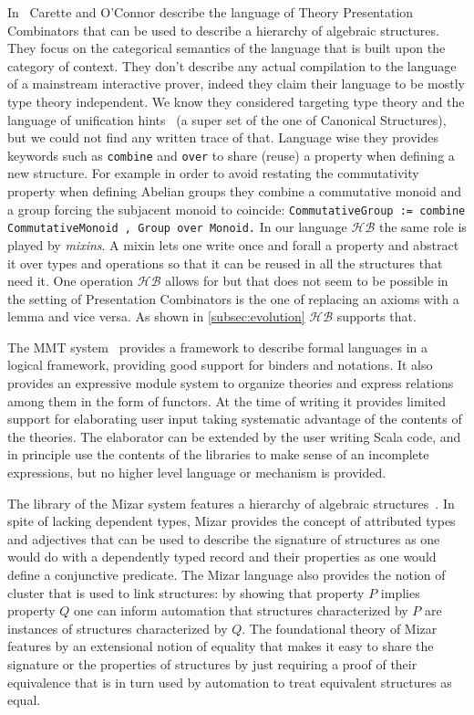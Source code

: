 \documentclass[a4paper,UKenglish,cleveref, autoref]{lipics-v2019}
\newcommand{\HB}{\ensuremath{\mathcal{HB}}}
\newcommand{\mixin}{mixin}
\newcommand{\mixins}{mixins}
\theoremstyle{implem}
\theoremstyle{implem}
\theoremstyle{command}
\begin{document}
{{In~\cite{CaretteCombinators} Carette and O'Connor describe the language of
Theory Presentation Combinators that can be used to describe a hierarchy of
algebraic structures.
They focus on the categorical semantics of the language that is built upon
the category of context.
They don't describe any actual compilation to the language of a mainstream
interactive prover, indeed they claim their language to be mostly type theory
independent. We know they considered targeting type theory and the language
of unification hints~\cite{10.1007/978-3-642-03359-9_8}
(a super set of the one of Canonical Structures),
but we could not find any written trace of that. Language wise they provides
keywords such as \verb+combine+ and \verb+over+ to share (reuse) a property
when defining a new structure. For example in order to avoid restating
the commutativity property when defining Abelian groups they combine
a commutative monoid and a group forcing the subjacent monoid to coincide: %
\verb-CommutativeGroup := combine CommutativeMonoid , Group over Monoid.-
In our language \HB{} the same role is played by \emph{\mixins{}}.
A \mixin{} lets one write once and forall a property and abstract it over types
and operations so that it can be reused in all the structures that need it.
One operation \HB{} allows for but that does not seem to be possible in the
setting of Presentation Combinators is the one of replacing an axioms with a
lemma and vice versa. As shown in \autoref{subsec:evolution} \HB{} supports
that.

The MMT system~\cite{RABE20131} provides a framework to describe formal
languages in a logical framework, providing good support for binders and
notations. It also provides an expressive module system to organize
theories and express relations among them in the form of functors.
At the time of writing
it provides limited support for elaborating user input taking systematic
advantage of the contents of the theories. The elaborator can be extended
by the user writing Scala code, and in principle use the contents of the
libraries to make sense of an incomplete expressions, but no higher level
language or mechanism is provided.

The library of the Mizar system features a hierarchy of algebraic
structures~\cite{7733265}. In spite of lacking dependent types, Mizar
provides the concept of attributed types and adjectives
that can be used to describe the signature of structures as one would
do with a dependently typed record and their properties as
one would define a conjunctive predicate.
The Mizar language also provides the notion of cluster that is used
to link structures: by showing that property $P$ implies property $Q$
one can inform automation that structures characterized by $P$ are
instances of structures characterized by $Q$. The foundational theory of Mizar
features by an extensional notion of equality that makes it easy
to share the signature or the properties of structures by just requiring
a proof of their equivalence that is in turn used by automation to treat
equivalent structures as equal.

}}
\end{document}
